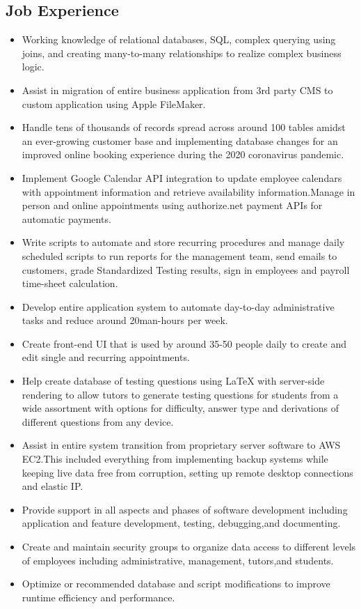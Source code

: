 \documentclass[]{resume}
\begin{document}
\subsection{Job Experience}
\begin{itemize}
\item Working knowledge of relational databases, SQL, complex querying using joins, and creating many-to-many relationships to realize complex business logic.
\item Assist in migration of entire business application from 3rd party CMS to custom application using Apple FileMaker.
\item Handle tens of thousands of records spread across around 100 tables amidst an ever-growing customer base and implementing database changes for an improved online booking experience during the 2020 coronavirus pandemic.
\item Implement Google Calendar API integration to update employee calendars with appointment information and retrieve availability information.Manage in person and online appointments using authorize.net payment APIs for automatic payments.
\item Write scripts to automate and store recurring procedures and manage daily scheduled scripts to run reports for the management team, send emails to customers, grade Standardized Testing results, sign in employees and payroll time-sheet calculation.
\item Develop entire application system to automate day-to-day administrative tasks and reduce around 20man-hours per week.
\item Create front-end UI that is used by around 35-50 people daily to create and edit single and recurring appointments.
\item Help create database of testing questions using LaTeX with server-side rendering to allow tutors to generate testing questions for students from a wide assortment with options for difficulty, answer type and derivations of different questions from any device.
\item Assist in entire system transition from proprietary server software to AWS EC2.This included everything from implementing backup systems while keeping live data free from corruption, setting up remote desktop connections and elastic IP.
\item Provide support in all aspects and phases of software development including application and feature development, testing, debugging,and documenting.
\item Create and maintain security groups to organize data access to different levels of employees including administrative, management, tutors,and students.
\item Optimize or recommended database and script modifications to improve runtime efficiency and performance.
\end{itemize}
\end{document}
